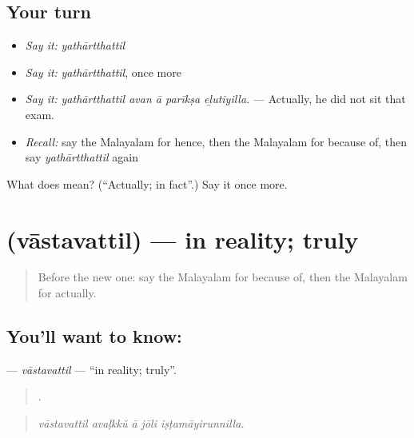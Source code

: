 \subsection*{Your turn}
\begin{itemize}
\raggedright
  \item \emph{Say it:} \emph{yathārtthattil}
  \item \emph{Say it:} \emph{yathārtthattil}, once more
  \item \emph{Say it:} \emph{yathārtthattil avan ā parīkṣa eḻutiyilla.} — Actually, he did not sit that exam.
  \item \emph{Recall:} say the Malayalam for hence, then the Malayalam for because of, then say \emph{yathārtthattil} again
\end{itemize}

\begin{tcolorbox}[breakable,colback=teal!4,colframe=teal!35!black,title={Before you move on}]
What does  mean? (\textquotedblleft{}Actually; in fact\textquotedblright{}.) Say it once more.
\end{tcolorbox}
\section[\texorpdfstring{\ml{വാസ്തവത്തിൽ} (vāstavattil)}{വാസ്തവത്തിൽ (vāstavattil)}]{ (vāstavattil) — in reality; truly}

\label{lesson:ML-C411-vastavattil}



\begin{quote}
Before the new one: say the Malayalam for because of, then the Malayalam for actually.
\end{quote}

\subsection*{You'll want to know: }
\textbf{} — \emph{vāstavattil} — \textquotedblleft{}in reality; truly\textquotedblright{}.

\begin{quote}
    .
\end{quote}

\begin{quote}
\emph{vāstavattil avaḷkkŭ ā jōli iṣṭamāyirunnilla.}
\end{quote}

